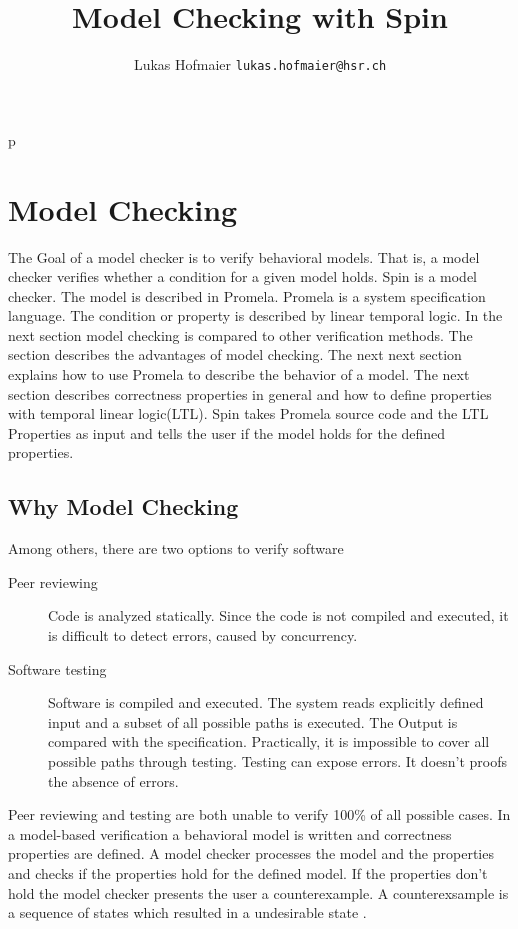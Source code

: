 p\documentclass[a4paper, twoside]{article}
\begin{document}
\title{Model Checking with Spin}
\author{Lukas Hofmaier \texttt{lukas.hofmaier@hsr.ch}}

\maketitle
\tableofcontents

\section{Model Checking}
\label{sec:modelchecking}

The Goal of a model checker is to verify behavioral models. That is, a model checker verifies whether a condition for a given model holds. Spin is a model checker. The model is described in Promela. Promela is a system specification language. The condition or property is described by linear temporal logic. In the next section model checking is compared to other verification methods. The section describes the advantages of model checking. The next next section explains how to use Promela to describe the behavior of a model. The next section describes correctness properties in general and how to define properties with temporal linear logic(LTL). Spin takes Promela source code and the LTL Properties as input and tells the user if the model holds for the defined properties.

\subsection{Why Model Checking}
\label{sec:why}

Among others, there are two options to verify software
\begin{description}
\item[Peer reviewing] Code is analyzed statically. Since the code is not compiled and executed, it is difficult to detect errors, caused by concurrency.
\item[Software testing] Software is compiled and executed. The system reads explicitly defined input and a subset of all possible paths is executed. The Output is compared with the specification. Practically, it is impossible to cover all possible paths through testing. Testing can expose errors. It doesn't proofs the absence of errors.
\end{description}

Peer reviewing and testing are both unable to verify 100\% of all possible cases. In a model-based verification a behavioral model is written and correctness properties are defined. A model checker processes the model and the properties and checks if the properties hold for the defined model. If the properties don't hold the model checker presents the user a counterexample. A counterexsample is a sequence of states which resulted in a undesirable state \cite{baier08}.
\end{document}
